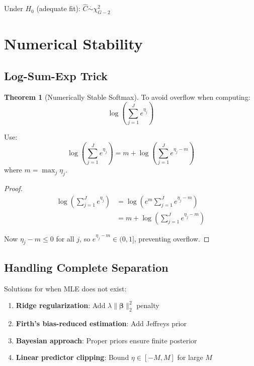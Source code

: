 \documentclass[11pt,letterpaper]{article}
\theoremstyle{definition}
\newtheorem{theorem}{Theorem}[section]
\newcommand{\bb}{\boldsymbol{\beta}}
\begin{document}
Under $H_0$ (adequate fit): $\hat{C} \stackrel{\cdot}{\sim} \chi^2_{G-2}$

\section{Numerical Stability}

\subsection{Log-Sum-Exp Trick}

\begin{theorem}[Numerically Stable Softmax]
To avoid overflow when computing:
\begin{equation}
    \log\left(\sum_{j=1}^{J} e^{\eta_j}\right)
\end{equation}

Use:
\begin{equation}
    \log\left(\sum_{j=1}^{J} e^{\eta_j}\right) = m + \log\left(\sum_{j=1}^{J} e^{\eta_j - m}\right)
    \label{eq:logsumexp}
\end{equation}
where $m = \max_j \eta_j$.
\end{theorem}

\begin{proof}
\begin{align}
    \log\left(\sum_{j=1}^{J} e^{\eta_j}\right) &= \log\left(e^m \sum_{j=1}^{J} e^{\eta_j - m}\right) \\
    &= m + \log\left(\sum_{j=1}^{J} e^{\eta_j - m}\right)
\end{align}

Now $\eta_j - m \leq 0$ for all $j$, so $e^{\eta_j - m} \in (0, 1]$, preventing overflow.
\end{proof}

\subsection{Handling Complete Separation}

Solutions for when MLE does not exist:
\begin{enumerate}
    \item \textbf{Ridge regularization}: Add $\lambda\|\bb\|_2^2$ penalty
    \item \textbf{Firth's bias-reduced estimation}: Add Jeffreys prior
    \item \textbf{Bayesian approach}: Proper priors ensure finite posterior
    \item \textbf{Linear predictor clipping}: Bound $\eta \in [-M, M]$ for large $M$
\end{enumerate}
\end{document}
